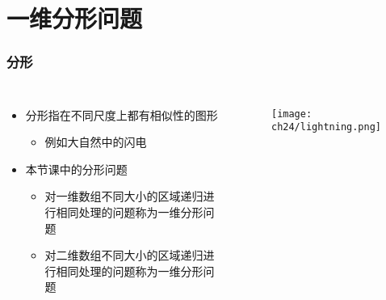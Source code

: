 \section{一维分形问题}

\begin{frame}[fragile]
    \frametitle{分形}
    
    \begin{columns}
        \begin{itemize}
            \item 分形指在不同尺度上都有相似性的图形
            \begin{itemize}
                \item 例如大自然中的闪电
            \end{itemize}
    
            \item 本节课中的分形问题
            \begin{itemize}
                \item 对一维数组不同大小的区域递归进行相同处理的问题称为一维分形问题
                \item 对二维数组不同大小的区域递归进行相同处理的问题称为一维分形问题
            \end{itemize}
        \end{itemize}

        \begin{figure}
            \texttt{[image: ch24/lightning.png]}
        \end{figure}
        
    \end{columns}
\end{frame}


